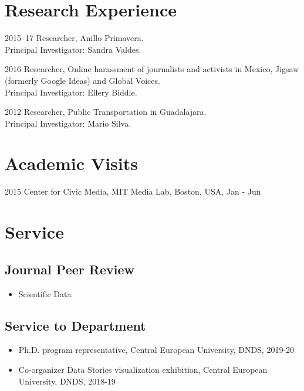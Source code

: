 \documentclass{academiccv}
\begin{document}
\section*{Research Experience}
\begin{tablist}
	\item[2015--17] 	\tab Researcher, Anillo Primavera. \\
									Principal Investigator: Sandra Valdes.
	\item[2016] 	\tab Researcher, Online harassment of journalists and activists in Mexico, Jigsaw (formerly Google Ideas) and Global Voices. \\
								Principal Investigator: Ellery Biddle.
	\item[2012] \tab Researcher, Public Transportation in Guadalajara. \\
							Principal Investigator: Mario Silva.
\end{tablist}

\section*{Academic Visits}
\begin{tablist}
	\item[2015] 	\tab Center for Civic Media, MIT Media Lab, Boston, USA, Jan - Jun
\end{tablist}

\section*{Service}
\subsection*{Journal Peer Review}
\begin{itemize}
  \item Scientific Data
\end{itemize}

\subsection*{Service to Department}
\begin{itemize}
	\item Ph.D. program representative, Central European University, DNDS, 2019-20
	\item Co-organizer Data Stories visualization exhibition, Central European University, DNDS, 2018-19
\end{itemize}
\end{document}
